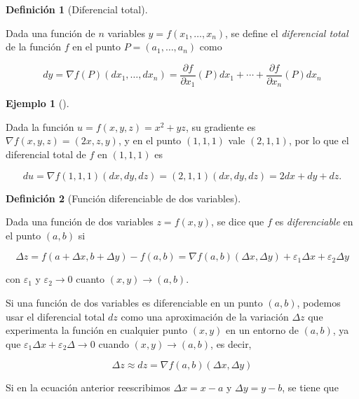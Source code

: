 \documentclass[
  a4paper,
]{scrreport}
\theoremstyle{definition}
\newtheorem{definition}{Definición}[chapter]
\theoremstyle{plain}
\theoremstyle{plain}
\theoremstyle{definition}
\theoremstyle{definition}
\newtheorem{example}{Ejemplo}[chapter]
\theoremstyle{plain}
\theoremstyle{remark}
\begin{document}
\begin{definition}[Diferencial
total]\protect\hypertarget{def-diferencial-total}{}\label{def-diferencial-total}

Dada una función de \(n\) variables \(y=f(x_1,\ldots,x_n)\), se define
el \emph{diferencial total} de la función \(f\) en el punto
\(P=(a_1, \ldots, a_n)\) como

\[
dy 
= \nabla f(P)(dx_1, \ldots, dx_n) 
= \frac{\partial f}{\partial x_1}(P)dx_1 + \cdots + \frac{\partial f}{\partial x_n}(P)dx_n
\]

\end{definition}

\begin{example}[]\protect\hypertarget{exm-diferencial-total}{}\label{exm-diferencial-total}

Dada la función \(u=f(x,y,z) = x^2+yz\), su gradiente es
\(\nabla f(x,y,z) = (2x, z, y)\), y en el punto \((1, 1, 1)\) vale
\((2, 1, 1)\), por lo que el diferencial total de \(f\) en \((1, 1, 1)\)
es

\[
du 
= \nabla f(1, 1, 1)(dx, dy, dz) 
= (2, 1, 1)(dx, dy, dz) 
= 2dx + dy + dz.
\]

\end{example}

\begin{definition}[Función diferenciable de dos
variables]\protect\hypertarget{def-funcion-2-variables-diferenciable}{}\label{def-funcion-2-variables-diferenciable}

Dada una función de dos variables \(z=f(x,y)\), se dice que \(f\) es
\emph{diferenciable} en el punto \((a,b)\) si

\[
\Delta z = f(a+\Delta x, b+\Delta y) - f(a,b) = \nabla f(a, b) (\Delta x, \Delta y) + \varepsilon_1 \Delta x + \varepsilon_2 \Delta y
\]

con \(\varepsilon_1\) y \(\varepsilon_2 \to 0\) cuanto
\((x,y)\to (a,b)\).

\end{definition}

Si una función de dos variables es diferenciable en un punto \((a,b)\),
podemos usar el diferencial total \(dz\) como una aproximación de la
variación \(\Delta z\) que experimenta la función en cualquier punto
\((x,y)\) en un entorno de \((a,b)\), ya que
\(\varepsilon_1 \Delta x + \varepsilon_2 \Delta \to 0\) cuando
\((x,y)\to (a,b)\), es decir,

\[
\Delta z \approx dz = \nabla f(a, b) (\Delta x, \Delta y)
\]

Si en la ecuación anterior reescribimos \(\Delta x = x-a\) y
\(\Delta y = y-b\), se tiene que
\end{document}
